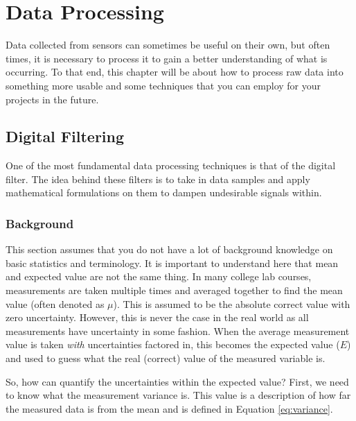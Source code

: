 %

\chapter{Data Processing}
\setchapterpreamble[u]{\margintoc}

Data collected from sensors can sometimes be useful on their own, but often times, it is necessary to process it to gain a better understanding of what is occurring.
To that end, this chapter will be about how to process raw data into something more usable and some techniques that you can employ for your projects in the future.

    \section{Digital Filtering} 
    One of the most fundamental data processing techniques is that of the digital filter.
    The idea behind these filters is to take in data samples and apply mathematical formulations on them to dampen undesirable signals within.
        
        \subsection{Background} This section assumes that you do not have a lot of background knowledge on basic statistics and terminology.
        It is important to understand here that mean and expected value are not the same thing.
        In many college lab courses, measurements are taken multiple times and averaged together to find the mean value (often denoted as $\mu$).
        This is assumed to be the absolute correct value with zero uncertainty.
        However, this is never the case in the real world as all measurements have uncertainty in some fashion.
        When the average measurement value is taken \textit{with} uncertainties factored in, this becomes the expected value ($E$) and used to guess what the real (correct) value of the measured variable is.

        So, how can quantify the uncertainties within the expected value? First, we need to know what the measurement variance is.
        This value is a description of how far the measured data is from the mean and is defined in Equation \ref{eq:variance}. 

